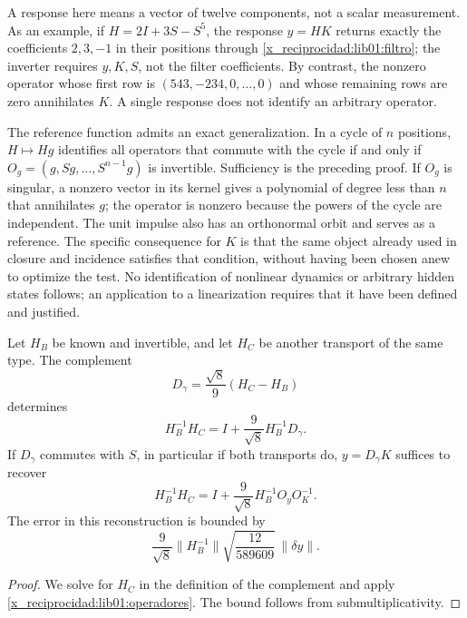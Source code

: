 A response here means a vector of twelve components, not a
scalar measurement. As an example, if \(H=2I+3S-S^5\), the response
\(y=HK\) returns exactly the coefficients \(2,3,-1\) in their
positions through \eqref{x_reciprocidad:lib01:filtro}; the inverter requires \(y,K,S\),
not the filter coefficients. By contrast, the nonzero operator whose first
row is \((543,-234,0,\ldots,0)\) and whose remaining rows are zero
annihilates \(K\). A single response does not identify an arbitrary operator.

The reference function admits an exact generalization. In a cycle of
\(n\) positions, \(H\mapsto Hg\) identifies all operators
that commute with the cycle if and only if
\(O_g=(g,Sg,\ldots,S^{n-1}g)\) is invertible. Sufficiency is the
preceding proof. If \(O_g\) is singular, a nonzero vector in its kernel
gives a polynomial of degree less than \(n\) that annihilates \(g\); the operator
is nonzero because the powers of the cycle are independent. The unit
impulse also has an orthonormal orbit and serves as a reference. The
specific consequence for \(K\) is that the same object already used in
closure and incidence satisfies that condition, without having been chosen
anew to optimize the test. No identification of
nonlinear dynamics or arbitrary hidden states follows; an application to
a linearization requires that it have been defined and justified.

\begin{corollary}
\label{x_reciprocidad:lib01:holonomia}
Let \(H_B\) be known and invertible, and let \(H_C\) be another transport of the same type. The complement
\[
 D_\gamma=\frac{\sqrt8}{9}(H_C-H_B)
\]
determines
\[
 H_B^{-1}H_C=I+\frac9{\sqrt8}H_B^{-1}D_\gamma.
\]
If \(D_\gamma\) commutes with \(S\), in particular if both transports do, \(y=D_\gamma K\) suffices to recover
\begin{equation}
 H_B^{-1}H_C
 =I+\frac9{\sqrt8}H_B^{-1}O_yO_K^{-1}.
 \label{x_reciprocidad:lib01:holonomia-una-respuesta}
\end{equation}
The error in this reconstruction is bounded by
\[
 \frac9{\sqrt8}\|H_B^{-1}\|
 \sqrt{\frac{12}{589609}}\,\|\delta y\|.
\]
\end{corollary}
\begin{proof}
We solve for \(H_C\) in the definition of the complement and apply
\cref{x_reciprocidad:lib01:operadores}. The bound follows from submultiplicativity.
\end{proof}

